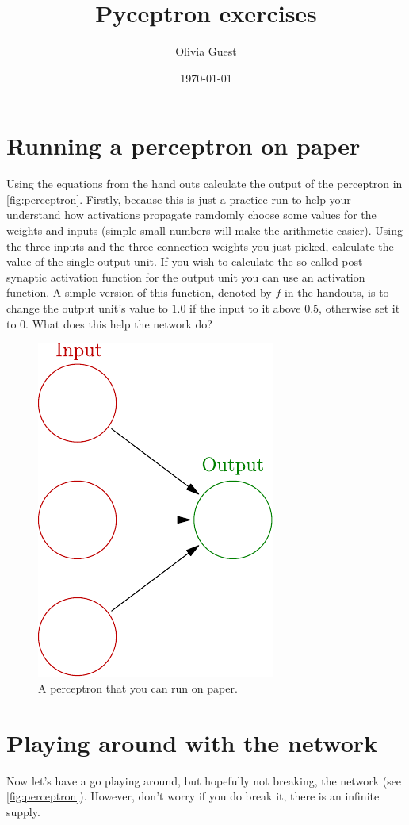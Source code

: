 \documentclass[a4paper,10pt]{article}
\title{Pyceptron exercises}
\author{Olivia Guest}
\date{\today}
\begin{document}
\maketitle
\section{Running a perceptron on paper}
Using the equations from the hand outs calculate the output of the perceptron in \autoref{fig:perceptron}. Firstly, because this is just a practice run to help your understand how activations propagate ramdomly choose some values for the weights and inputs (simple small numbers will make the arithmetic easier). Using the three inputs and the three connection weights you just picked, calculate the value of the single output unit. If you wish to calculate the so-called post-synaptic activation function for the output unit you can use an activation function. A simple version of this function, denoted by $f$ in the handouts, is to change the output unit's value to $1.0$ if the input to it above $0.5$, otherwise set it to $0$. What does this help the network do?

\begin{figure}[hb]
 \centering
 \includegraphics{../slides/fig/perceptron_empty.pdf}
 \caption{A perceptron that you can run on paper.}
 \label{fig:perceptron}
\end{figure}
\section{Playing around with the network}
Now let's have a go playing around, but hopefully not breaking, the network (see \autoref{fig:perceptron}). However, don't worry if you do break it, there is an infinite supply.
\end{document}
